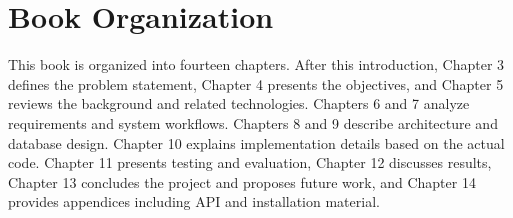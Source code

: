 \section{Book Organization}

This book is organized into fourteen chapters. After this introduction, Chapter 3 defines the problem statement, Chapter 4 presents the objectives, and Chapter 5 reviews the background and related technologies. Chapters 6 and 7 analyze requirements and system workflows. Chapters 8 and 9 describe architecture and database design. Chapter 10 explains implementation details based on the actual code. Chapter 11 presents testing and evaluation, Chapter 12 discusses results, Chapter 13 concludes the project and proposes future work, and Chapter 14 provides appendices including API and installation material.

